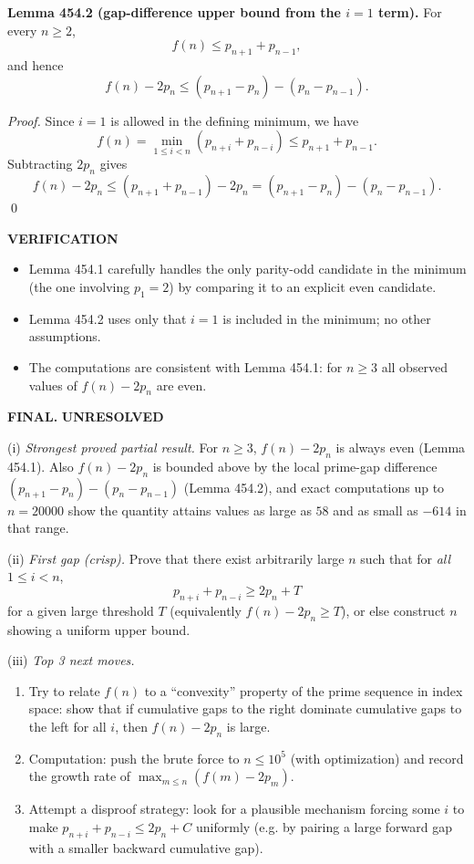 \medskip

\textbf{Lemma 454.2 (gap-difference upper bound from the $i=1$ term).}
For every $n\ge 2$,
\[
 f(n)\le p_{n+1}+p_{n-1},
\]
and hence
\[
 f(n)-2p_n\le (p_{n+1}-p_n)-(p_n-p_{n-1}).
\]

\emph{Proof.}
Since $i=1$ is allowed in the defining minimum, we have
\[
 f(n)=\min_{1\le i<n}(p_{n+i}+p_{n-i})\le p_{n+1}+p_{n-1}.
\]
Subtracting $2p_n$ gives
\[
 f(n)-2p_n\le (p_{n+1}+p_{n-1})-2p_n=(p_{n+1}-p_n)-(p_n-p_{n-1}).
\]
\qed

\medskip

\textbf{VERIFICATION}

\begin{itemize}
\item Lemma 454.1 carefully handles the only parity-odd candidate in the minimum (the one involving $p_1=2$) by comparing it to an explicit even candidate.
\item Lemma 454.2 uses only that $i=1$ is included in the minimum; no other assumptions.
\item The computations are consistent with Lemma 454.1: for $n\ge 3$ all observed values of $f(n)-2p_n$ are even.
\end{itemize}

\textbf{FINAL.} \textbf{UNRESOLVED}

(i) \emph{Strongest proved partial result.} For $n\ge 3$, $f(n)-2p_n$ is always even (Lemma 454.1). Also $f(n)-2p_n$ is bounded above by the local prime-gap difference $(p_{n+1}-p_n)-(p_n-p_{n-1})$ (Lemma 454.2), and exact computations up to $n=20000$ show the quantity attains values as large as $58$ and as small as $-614$ in that range.

(ii) \emph{First gap (crisp).} Prove that there exist arbitrarily large $n$ such that for \emph{all} $1\le i<n$,
\[
p_{n+i}+p_{n-i}\ge 2p_n + T
\]
for a given large threshold $T$ (equivalently $f(n)-2p_n\ge T$), or else construct $n$ showing a uniform upper bound.

(iii) \emph{Top 3 next moves.}
\begin{enumerate}
\item Try to relate $f(n)$ to a ``convexity'' property of the prime sequence in index space: show that if cumulative gaps to the right dominate cumulative gaps to the left for all $i$, then $f(n)-2p_n$ is large.
\item Computation: push the brute force to $n\le 10^5$ (with optimization) and record the growth rate of $\max_{m\le n}(f(m)-2p_m)$.
\item Attempt a disproof strategy: look for a plausible mechanism forcing some $i$ to make $p_{n+i}+p_{n-i}\le 2p_n+C$ uniformly (e.g. by pairing a large forward gap with a smaller backward cumulative gap).
\end{enumerate}

